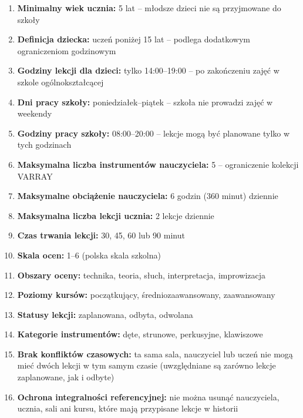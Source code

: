 \documentclass[12pt,a4paper]{article}
\begin{document}
\begin{enumerate}
    \item \textbf{Minimalny wiek ucznia:} 5 lat -- młodsze dzieci nie są przyjmowane do szkoły

    \item \textbf{Definicja dziecka:} uczeń poniżej 15 lat -- podlega dodatkowym ograniczeniom godzinowym

    \item \textbf{Godziny lekcji dla dzieci:} tylko 14:00--19:00 -- po zakończeniu zajęć w szkole ogólnokształcącej

    \item \textbf{Dni pracy szkoły:} poniedziałek--piątek -- szkoła nie prowadzi zajęć w weekendy

    \item \textbf{Godziny pracy szkoły:} 08:00--20:00 -- lekcje mogą być planowane tylko w tych godzinach

    \item \textbf{Maksymalna liczba instrumentów nauczyciela:} 5 -- ograniczenie kolekcji VARRAY

    \item \textbf{Maksymalne obciążenie nauczyciela:} 6 godzin (360 minut) dziennie

    \item \textbf{Maksymalna liczba lekcji ucznia:} 2 lekcje dziennie

    \item \textbf{Czas trwania lekcji:} 30, 45, 60 lub 90 minut

    \item \textbf{Skala ocen:} 1--6 (polska skala szkolna)

    \item \textbf{Obszary oceny:} technika, teoria, słuch, interpretacja, improwizacja

    \item \textbf{Poziomy kursów:} początkujący, średniozaawansowany, zaawansowany

    \item \textbf{Statusy lekcji:} zaplanowana, odbyta, odwolana

    \item \textbf{Kategorie instrumentów:} dęte, strunowe, perkusyjne, klawiszowe

    \item \textbf{Brak konfliktów czasowych:} ta sama sala, nauczyciel lub uczeń nie mogą mieć dwóch lekcji w tym samym czasie (uwzględniane są zarówno lekcje zaplanowane, jak i odbyte)

    \item \textbf{Ochrona integralności referencyjnej:} nie można usunąć nauczyciela, ucznia, sali ani kursu, które mają przypisane lekcje w historii
\end{enumerate}
\end{document}
